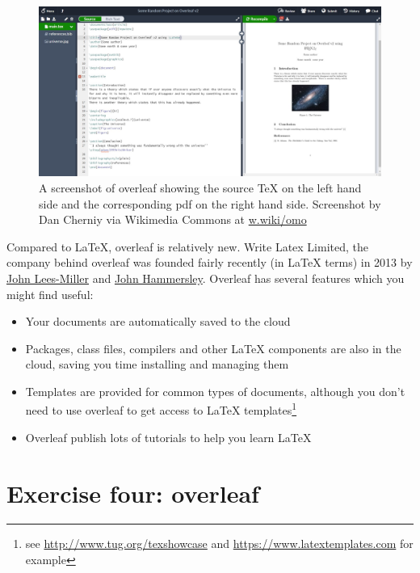 \documentclass[
]{book}
\providecommand{\tightlist}{%
  \setlength{\itemsep}{0pt}\setlength{\parskip}{0pt}}
\begin{document}
\begin{figure}

{\centering \includegraphics[width=1\linewidth]{images/Overleaf_v2_editing_page} 

}

\caption{A screenshot of overleaf showing the source TeX on the left hand side and the corresponding pdf on the right hand side. Screenshot by Dan Cherniy via Wikimedia Commons at \href{https://w.wiki/omo}{w.wiki/omo}}\label{fig:overleaf-fig}
\end{figure}



Compared to LaTeX, overleaf is relatively new. Write Latex Limited, the company behind overleaf was founded fairly recently (in LaTeX terms) in 2013 by \href{https://www.linkedin.com/in/jdleesmiller/}{John Lees-Miller} and \href{https://www.linkedin.com/in/john-hammersley-6419a266/}{John Hammersley}. Overleaf has several features which you might find useful:

\begin{itemize}
\tightlist
\item
  Your documents are automatically saved to the cloud
\item
  Packages, class files, compilers and other LaTeX components are also in the cloud, saving you time installing and managing them
\item
  Templates are provided for common types of documents, although you don't need to use overleaf to get access to LaTeX templates\footnote{see \url{http://www.tug.org/texshowcase} and \url{https://www.latextemplates.com} for example}
\item
  Overleaf publish lots of tutorials to help you learn LaTeX
\end{itemize}

\hypertarget{ex4}{%
\section{Exercise four: overleaf}\label{ex4}}
\end{document}

